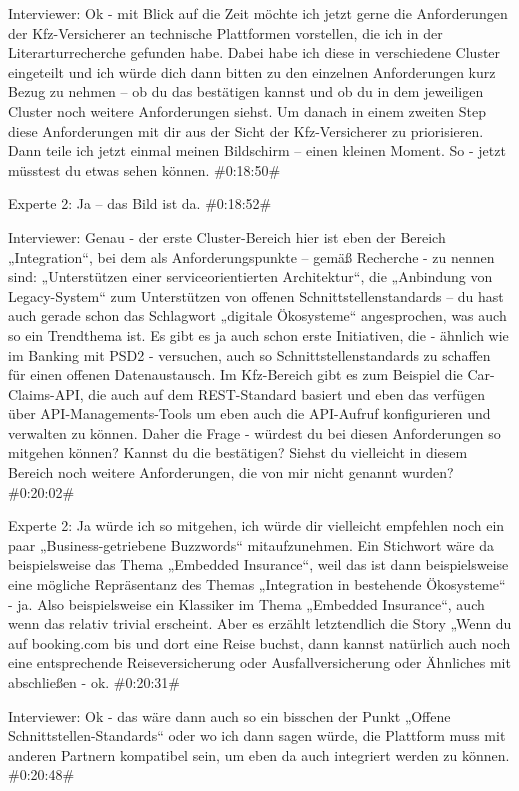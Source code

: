 Interviewer:
Ok - mit Blick auf die Zeit möchte ich jetzt gerne die Anforderungen der Kfz-Versicherer an technische Plattformen vorstellen, die ich in der Literarturrecherche gefunden habe. Dabei habe ich diese in verschiedene Cluster eingeteilt und ich würde dich dann bitten zu den einzelnen Anforderungen kurz Bezug zu nehmen – ob du das bestätigen kannst und ob du in dem jeweiligen Cluster noch weitere Anforderungen siehst. Um danach in einem zweiten Step diese Anforderungen mit dir aus der Sicht der Kfz-Versicherer zu priorisieren. Dann teile ich jetzt einmal meinen Bildschirm – einen kleinen Moment. So - jetzt müsstest du etwas sehen können.
\#0:18:50\#

Experte 2:
Ja – das Bild ist da.
\#0:18:52\#

Interviewer:
Genau - der erste Cluster-Bereich hier ist eben der Bereich „Integration“, bei dem als Anforderungspunkte – gemäß Recherche - zu nennen sind: „Unterstützen einer serviceorientierten Architektur“, die „Anbindung von Legacy-System“ zum Unterstützen von offenen Schnittstellenstandards – du hast auch gerade schon das Schlagwort „digitale Ökosysteme“ angesprochen, was auch so ein Trendthema ist. Es gibt es ja auch schon erste Initiativen, die - ähnlich wie im Banking mit PSD2 - versuchen, auch so Schnittstellenstandards zu schaffen für einen offenen Datenaustausch. Im Kfz-Bereich gibt es zum Beispiel die Car-Claims-API, die auch auf dem REST-Standard basiert und eben das verfügen über API-Managements-Tools um eben auch die API-Aufruf konfigurieren und verwalten zu können. Daher die Frage - würdest du bei diesen Anforderungen so mitgehen können? Kannst du die bestätigen? Siehst du vielleicht in diesem Bereich noch weitere Anforderungen, die von mir nicht genannt wurden?
\#0:20:02\#

Experte 2:
Ja würde ich so mitgehen, ich würde dir vielleicht empfehlen noch ein paar „Business-getriebene Buzzwords“ mitaufzunehmen. Ein Stichwort wäre da beispielsweise das Thema „Embedded Insurance“, weil das ist dann beispielsweise eine mögliche Repräsentanz des Themas „Integration in bestehende Ökosysteme“ - ja. Also beispielsweise ein Klassiker im Thema „Embedded Insurance“, auch wenn das relativ trivial erscheint. Aber es erzählt letztendlich die Story „Wenn du auf booking.com bis und dort eine Reise buchst, dann kannst natürlich auch noch eine entsprechende Reiseversicherung oder Ausfallversicherung oder Ähnliches mit abschließen - ok.
\#0:20:31\#

Interviewer:
Ok - das wäre dann auch so ein bisschen der Punkt „Offene Schnittstellen-Standards“ oder wo ich dann sagen würde, die Plattform muss mit anderen Partnern kompatibel sein, um eben da auch integriert werden zu können.
\#0:20:48\#

